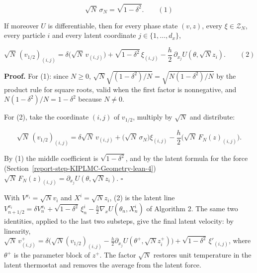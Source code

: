 \documentclass[11pt,a4paper]{report}
\begin{document}
\[\sqrt N\,\sigma_N=\sqrt{1-\delta^2}.\qquad(1)\]


If moreover \(U\) is differentiable, then for every phase state \((v,z)\), every \(\xi\in\mathcal Z_N\), every particle \(i\) and every latent coordinate \(j\in\{1,\dots,d_x\}\),


\[\sqrt N\,(v_{1/2})_{(i,j)}=\delta\bigl(\sqrt N\,v_{(i,j)}\bigr)+\sqrt{1-\delta^2}\,\xi_{(i,j)}-\frac h2\,\partial_{x_j}U(\theta,\sqrt Nz_i).\qquad(2)\]


\textbf{Proof.} For (1): since \(N\ge0\), \(\sqrt N\sqrt{(1-\delta^2)/N}=\sqrt{N(1-\delta^2)/N}\) by the product rule for square roots, valid when the first factor is nonnegative, and \(N(1-\delta^2)/N=1-\delta^2\) because \(N\ne0\).




For (2), take the coordinate \((i,j)\) of \(v_{1/2}\), multiply by \(\sqrt N\) and distribute:


\[\sqrt N\,(v_{1/2})_{(i,j)}=\delta\sqrt N\,v_{(i,j)}+\bigl(\sqrt N\,\sigma_N\bigr)\xi_{(i,j)}-\frac h2\bigl(\sqrt N\,F_N(z)_{(i,j)}\bigr).\]


By (1) the middle coefficient is \(\sqrt{1-\delta^2}\), and by the latent formula for the force (Section~\ref{report-step-KIPLMC-Geometry-lean-4}) \(\sqrt N\,F_N(z)_{(i,j)}=\partial_{x_j}U(\theta,\sqrt Nz_i)\). \(\square\)




With \(V^{x_i}=\sqrt Nv_i\) and \(X^i=\sqrt Nz_i\), (2) is the latent line \(V^{x_i}_{n+1/2}=\delta V^{x_i}_n+\sqrt{1-\delta^2}\,\xi^i_n-\frac h2\nabla_xU(\theta_n,X^i_n)\) of Algorithm 2. The same two identities, applied to the last two substeps, give the final latent velocity: by linearity, \(\sqrt N\,v^+_{(i,j)}=\delta\bigl(\sqrt N(v_{1/2})_{(i,j)}-\frac h2\partial_{x_j}U(\theta^+,\sqrt Nz^+_i)\bigr)+\sqrt{1-\delta^2}\,\xi'_{(i,j)}\), where \(\theta^+\) is the parameter block of \(z^+\). The factor \(\sqrt N\) restores unit temperature in the latent thermostat and removes the average from the latent force.
\end{document}
